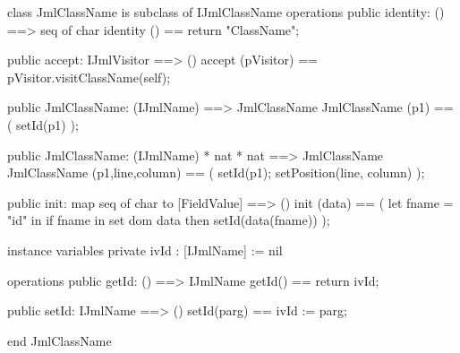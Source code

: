 \begin{vdm_al}
class JmlClassName is subclass of IJmlClassName
operations
  public identity: () ==> seq of char
  identity () == return "ClassName";

  public accept: IJmlVisitor ==> ()
  accept (pVisitor) == pVisitor.visitClassName(self);

  public JmlClassName:
    (IJmlName) ==> JmlClassName
  JmlClassName (p1) == 
    ( setId(p1) );

  public JmlClassName:
    (IJmlName) *
    nat *
    nat ==> JmlClassName
  JmlClassName (p1,line,column) == 
    ( setId(p1);
      setPosition(line, column) );

  public init: map seq of char to [FieldValue] ==> ()
  init (data) ==
    ( let fname = "id" in
        if fname in set dom data
        then setId(data(fname)) );

instance variables
  private ivId : [IJmlName] := nil

operations
  public getId: () ==> IJmlName
  getId() == return ivId;

  public setId: IJmlName ==> ()
  setId(parg) == ivId := parg;

end JmlClassName
\end{vdm_al}

